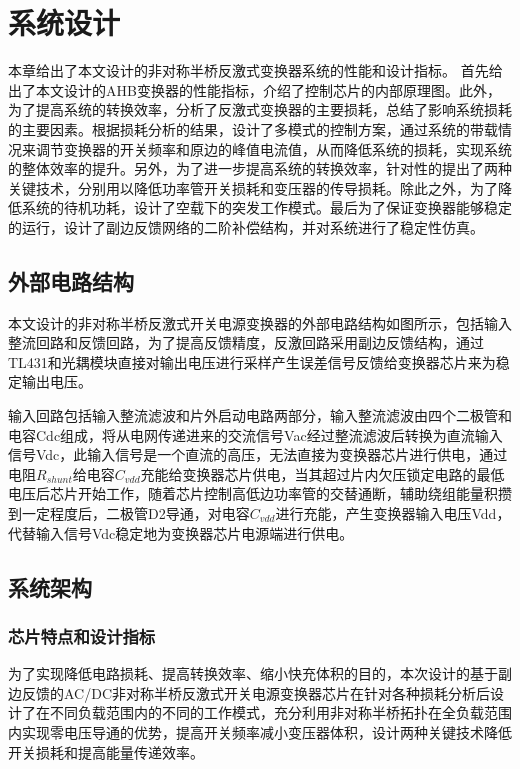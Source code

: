 

\chapter{系统设计}
本章给出了本文设计的非对称半桥反激式变换器系统的性能和设计指标。 首先给出了本文设计的AHB变换器的性能指标，介绍了控制芯片的内部原理图。此外， 为了提高系统的转换效率，分析了反激式变换器的主要损耗，总结了影响系统损耗的主要因素。根据损耗分析的结果，设计了多模式的控制方案，通过系统的带载情况来调节变换器的开关频率和原边的峰值电流值，从而降低系统的损耗，实现系统的整体效率的提升。另外，为了进一步提高系统的转换效率，针对性的提出了两种关键技术，分别用以降低功率管开关损耗和变压器的传导损耗。除此之外，为了降低系统的待机功耗，设计了空载下的突发工作模式。最后为了保证变换器能够稳定的运行，设计了副边反馈网络的二阶补偿结构，并对系统进行了稳定性仿真。


\section{外部电路结构}
本文设计的非对称半桥反激式开关电源变换器的外部电路结构如图所示，包括输入整流回路和反馈回路，为了提高反馈精度，反激回路采用副边反馈结构，通过TL431和光耦模块直接对输出电压进行采样产生误差信号反馈给变换器芯片来为稳定输出电压。

输入回路包括输入整流滤波和片外启动电路两部分，输入整流滤波由四个二极管和电容Cdc组成，将从电网传递进来的交流信号Vac经过整流滤波后转换为直流输入信号Vdc，此输入信号是一个直流的高压，无法直接为变换器芯片进行供电，通过电阻$R_{shunt}$给电容$C_{vdd}$充能给变换器芯片供电，当其超过片内欠压锁定电路的最低电压后芯片开始工作，随着芯片控制高低边功率管的交替通断，辅助绕组能量积攒到一定程度后，二极管D2导通，对电容$C_{vdd}$进行充能，产生变换器输入电压Vdd，代替输入信号Vdc稳定地为变换器芯片电源端进行供电。


\section{系统架构}

\subsection{芯片特点和设计指标}

为了实现降低电路损耗、提高转换效率、缩小快充体积的目的，本次设计的基于副边反馈的AC/DC非对称半桥反激式开关电源变换器芯片在针对各种损耗分析后设计了在不同负载范围内的不同的工作模式，充分利用非对称半桥拓扑在全负载范围内实现零电压导通的优势，提高开关频率减小变压器体积，设计两种关键技术降低开关损耗和提高能量传递效率。

